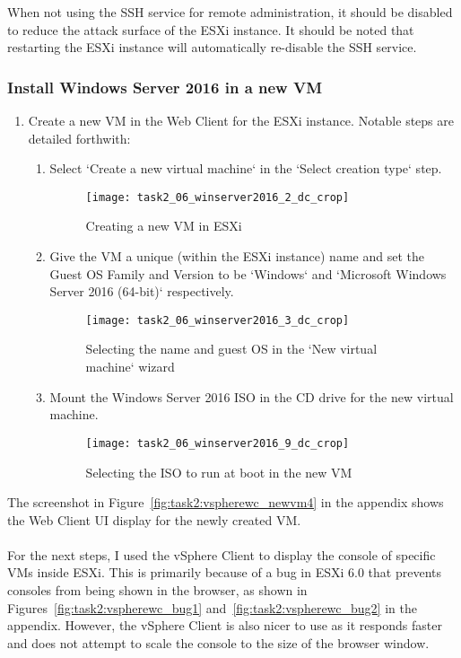 \noindent When not using the SSH service for remote administration, it should be disabled to reduce the attack surface of the ESXi instance. It should be noted that restarting the ESXi instance will automatically re-disable the SSH service.

\subsubsection{Install Windows Server 2016 in a new VM}
\begin{enumerate}[series=task2methodology2]
  \item Create a new VM in the Web Client for the ESXi instance. Notable steps are detailed forthwith:
    \begin{enumerate}[label=(\alph*)]
      \item Select `Create a new virtual machine` in the `Select creation type` step.
        \begin{figure}[H]
          \centering
          \captionsetup{skip=2pt}
          \texttt{[image: task2\_06\_winserver2016\_2\_dc\_crop]}
          \caption{Creating a new VM in ESXi}
          \label{fig:task2:vspherewc_newvm1}
        \end{figure}
      \item Give the VM a unique (within the ESXi instance) name and set the Guest OS Family and Version to be `Windows` and `Microsoft Windows Server 2016 (64-bit)` respectively.
        \begin{figure}[H]
          \centering
          \captionsetup{skip=2pt}
          \texttt{[image: task2\_06\_winserver2016\_3\_dc\_crop]}
          \caption{Selecting the name and guest OS in the `New virtual machine` wizard}
          \label{fig:task2:vspherewc_newvm2}
        \end{figure}
      \item Mount the Windows Server 2016 ISO in the CD drive for the new virtual machine.
        \begin{figure}[H]
          \centering
          \captionsetup{skip=2pt}
          \texttt{[image: task2\_06\_winserver2016\_9\_dc\_crop]}
          \caption{Selecting the ISO to run at boot in the new VM}
          \label{fig:task2:vspherewc_newvm3}
        \end{figure}
    \end{enumerate}
\end{enumerate}

\noindent The screenshot in Figure~\ref{fig:task2:vspherewc_newvm4} in the  appendix shows the Web Client UI display for the newly created VM.\\\\
\noindent For the next steps, I used the vSphere Client to display the console of specific VMs inside ESXi. This is primarily because of a bug in ESXi 6.0 that prevents consoles from being shown in the browser, as shown in Figures~\ref{fig:task2:vspherewc_bug1} and~\ref{fig:task2:vspherewc_bug2} in the  appendix. However, the vSphere Client is also nicer to use as it responds faster and does not attempt to scale the console to the size of the browser window.

